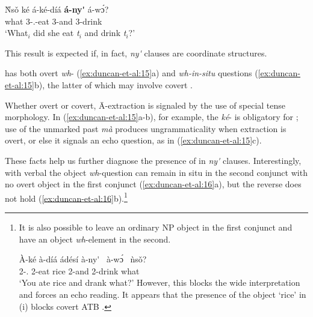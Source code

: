 \documentclass[output=paper,modfonts,nonflat,
colorlinks, citecolor=brown,
draftmode
]{langsci/langscibook}
\begin{document}
\ea\label{ex:duncan-et-al:14}
\gll \`{N}s\v{o} ké á-ké-díá \textbf{á-ny\'{\textturnv}\ng} á-\ng w\'ɔ\ng? \\
what {\FOC} 3{\SG-\PST.\FOC}-eat 3{\SG}-and 3{\SG}-drink \\
\glt `What$_i$ did she eat \textit{t}$_i$ and drink \textit{t}$_i$?'
\z

\noindent This result is expected if, in fact, \textit{ny\'{\textturnv}\ng} clauses are coordinate structures.

 has both overt \textit{wh}- (\ref{ex:duncan-et-al:15}a) and \textit{wh-in-situ} questions (\ref{ex:duncan-et-al:15}b), the latter of which may involve covert .

\ea\label{ex:duncan-et-al:15}
\z
\z

\noindent Whether overt or covert, \={A}-extraction is signaled by the use of special  tense morphology. In (\ref{ex:duncan-et-al:15}a-b), for example, the  \textit{ké}- is obligatory for ; use of the unmarked past  \textit{mà} produces ungrammaticality when extraction is overt, or else it signals an echo question, as in (\ref{ex:duncan-et-al:15}c).

These facts help us further diagnose the presence of  in \textit{ny\'{\textturnv}\ng} clauses. Interestingly, with verbal  the object \textit{wh}-question can remain {in situ} in the second conjunct with no overt object in the first conjunct (\ref{ex:duncan-et-al:16}a), but the reverse does not hold (\ref{ex:duncan-et-al:16}b).\footnote{It is also possible to leave an ordinary NP object in the first conjunct and have an object \textit{wh}-element in the second.

\ea\label{ex:duncan-et-al:i}
\gll \`{A}-ké à-díá ádésí à-ny\'{\textturnv}\ng~ à-\ng w\'ɔ\ng~ ǹs\v{o}? \\
2{\SG-\PST.\FOC} 2{\SG}-eat rice 2{\SG}-and 2{\SG}-drink what \\
\glt `You ate rice and drank what?'
\z
However, this blocks the wide  interpretation and forces an echo reading. It appears that the presence of the object `rice' in (i) blocks covert ATB .}
\end{document}
